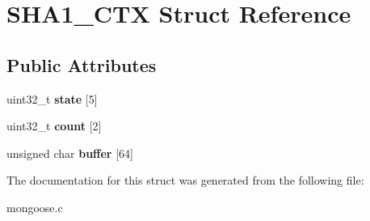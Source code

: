 \hypertarget{struct_s_h_a1___c_t_x}{\section{S\-H\-A1\-\_\-\-C\-T\-X Struct Reference}
\label{struct_s_h_a1___c_t_x}
}
\subsection*{Public Attributes}
\begin{DoxyCompactItemize}
\item 
\hypertarget{struct_s_h_a1___c_t_x_a81d7f6018258ee84f001284c6ff9d2d5}{uint32\-\_\-t {\bfseries state} \mbox{[}5\mbox{]}}\label{struct_s_h_a1___c_t_x_a81d7f6018258ee84f001284c6ff9d2d5}

\item 
\hypertarget{struct_s_h_a1___c_t_x_a7db1dac8c2309a5b22f1cf4bc5de96a5}{uint32\-\_\-t {\bfseries count} \mbox{[}2\mbox{]}}\label{struct_s_h_a1___c_t_x_a7db1dac8c2309a5b22f1cf4bc5de96a5}

\item 
\hypertarget{struct_s_h_a1___c_t_x_a90100b1aab0fedb1d72ded66abeeffe2}{unsigned char {\bfseries buffer} \mbox{[}64\mbox{]}}\label{struct_s_h_a1___c_t_x_a90100b1aab0fedb1d72ded66abeeffe2}

\end{DoxyCompactItemize}


The documentation for this struct was generated from the following file\-:\begin{DoxyCompactItemize}
\item 
mongoose.\-c\end{DoxyCompactItemize}
